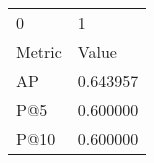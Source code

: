 \begin{tabular}{ll}
0 & 1 \\
Metric & Value \\
AP & 0.643957 \\
P@5 & 0.600000 \\
P@10 & 0.600000 \\
\end{tabular}
